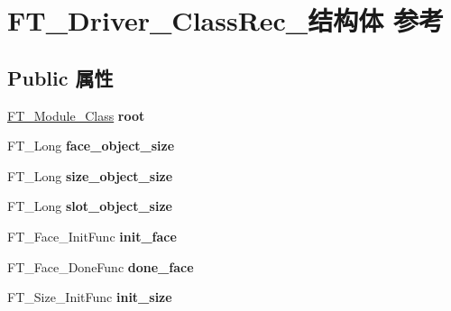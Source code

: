 \hypertarget{struct_f_t___driver___class_rec__}{}\section{F\+T\+\_\+\+Driver\+\_\+\+Class\+Rec\+\_\+结构体 参考}
\label{struct_f_t___driver___class_rec__}
\subsection*{Public 属性}
\begin{DoxyCompactItemize}
\item 
\mbox{\label{struct_f_t___driver___class_rec___a087ca3e2c562bb90b8af82b31e82d8c7}} 
\hyperlink{struct_f_t___module___class__}{F\+T\+\_\+\+Module\+\_\+\+Class} {\bfseries root}
\item 
\mbox{\label{struct_f_t___driver___class_rec___a194fc6fbae019e9c109c65328e57e44f}} 
F\+T\+\_\+\+Long {\bfseries face\+\_\+object\+\_\+size}
\item 
\mbox{\label{struct_f_t___driver___class_rec___a436687825ee47ed94da71fda90e2f578}} 
F\+T\+\_\+\+Long {\bfseries size\+\_\+object\+\_\+size}
\item 
\mbox{\label{struct_f_t___driver___class_rec___adcce7eb86dd7c763b622818cfcde99a6}} 
F\+T\+\_\+\+Long {\bfseries slot\+\_\+object\+\_\+size}
\item 
\mbox{\label{struct_f_t___driver___class_rec___a68e94aeae3e78ed5984c29189c64df9a}} 
F\+T\+\_\+\+Face\+\_\+\+Init\+Func {\bfseries init\+\_\+face}
\item 
\mbox{\label{struct_f_t___driver___class_rec___a7d37afe63f914ae28ed02c960e4d5642}} 
F\+T\+\_\+\+Face\+\_\+\+Done\+Func {\bfseries done\+\_\+face}
\item 
\mbox{\label{struct_f_t___driver___class_rec___a0aec58307bc166f0e74c890509638ddf}} 
F\+T\+\_\+\+Size\+\_\+\+Init\+Func {\bfseries init\+\_\+size}
\item 

\end{DoxyCompactItemize}
